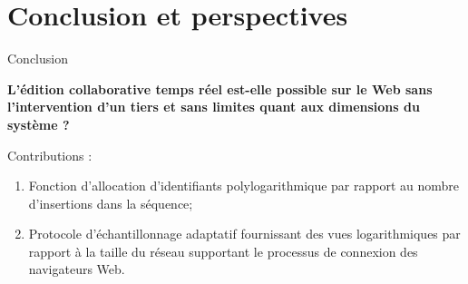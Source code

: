 \section{Conclusion et perspectives}

  



\begin{frame}{Conclusion}
  
  \textbf{\large L'édition collaborative temps réel est-elle possible sur le Web
    sans l'intervention d'un tiers et sans limites quant aux dimensions du
    système ? \YES{\cmark}}

  \vspace{1cm}

  Contributions :
  \begin{enumerate}
  \item %
    Fonction d'allocation d'identifiants polylogarithmique par rapport au nombre
    d'insertions dans la séquence; \vspace{0.2cm}
  \item %
    Protocole d'échantillonnage adaptatif fournissant des vues logarithmiques
    par rapport à la taille du réseau supportant le processus de connexion des
    navigateurs Web.
  \end{enumerate}


\end{frame}



